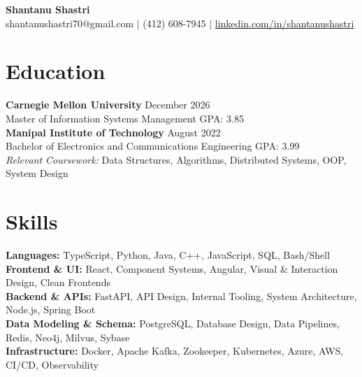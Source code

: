 \documentclass[11pt,a4paper]{article}
\begin{document}
\begin{center}
    \Huge \textbf{Shantanu Shastri} \\
    \vspace{2pt}
    \small shantanushastri70@gmail.com $|$ (412) 608-7945 $|$ \href{https://linkedin.com/in/shantanushastri}{linkedin.com/in/shantanushastri}
\end{center}

\vspace{-5pt}
\section{Education}
\noindent
\textbf{Carnegie Mellon University} \hfill December 2026 \\
Master of Information Systems Management \hfill GPA: 3.85 \\
\textbf{Manipal Institute of Technology} \hfill August 2022 \\
Bachelor of Electronics and Communications Engineering \hfill GPA: 3.99 \\
\textit{Relevant Coursework:} Data Structures, Algorithms, Distributed Systems, OOP, System Design

\vspace{-5pt}
\section{Skills}
\noindent
\textbf{Languages:} TypeScript, Python, Java, C++, JavaScript, SQL, Bash/Shell \\
\textbf{Frontend \& UI:} React, Component Systems, Angular, Visual \& Interaction Design, Clean Frontends \\
\textbf{Backend \& APIs:} FastAPI, API Design, Internal Tooling, System Architecture, Node.js, Spring Boot \\
\textbf{Data Modeling \& Schema:} PostgreSQL, Database Design, Data Pipelines, Redis, Neo4j, Milvus, Sybase \\
\textbf{Infrastructure:} Docker, Apache Kafka, Zookeeper, Kubernetes, Azure, AWS, CI/CD, Observability

\vspace{-5pt}
\end{document}
